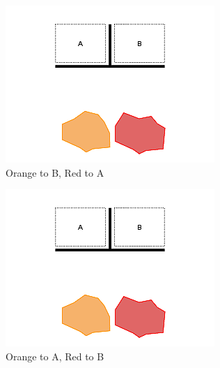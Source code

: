 \documentclass[]{article}
\begin{document}
\begin{figure}
\begin{subfigure}{0.42\textwidth}
		\includegraphics[width=\linewidth]{slide_images/Swarm_Robot_Control_-_Unknown_Number_of_Robots_0013.png}
		\caption{Orange to B, Red to A}
		\label{fig:sub1}
	\end{subfigure}%
	\begin{subfigure}{0.42\textwidth}
		\centering
		\includegraphics[width=\linewidth]{slide_images/Swarm_Robot_Control_-_Unknown_Number_of_Robots_0015.png}
		\caption{Orange to A, Red to B}
		\label{fig:sub2}
	\end{subfigure}
	\begin{subfigure}{0.42\textwidth}
		\centering

\end{subfigure}
\end{figure}
\end{document}
